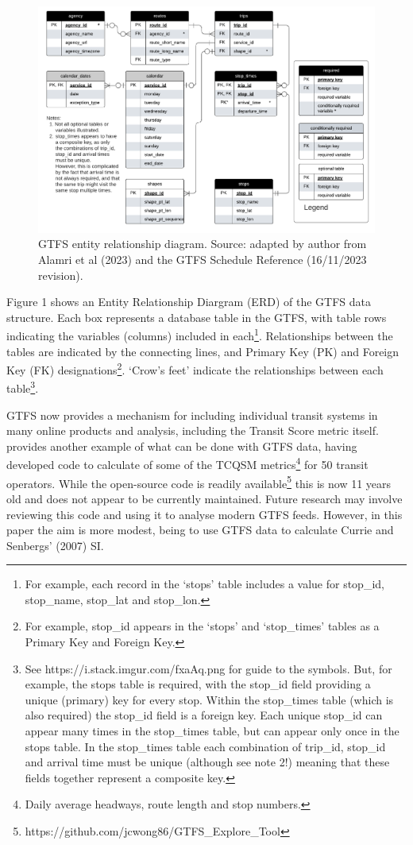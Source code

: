 \documentclass[preprint, 3p,
authoryear]{elsarticle} %
\begin{document}
\begin{figure}
\includegraphics[width=1\linewidth]{graphics/GTFS} \caption{GTFS entity relationship diagram. Source: adapted by author from Alamri et al (2023) and the GTFS Schedule Reference (16/11/2023 revision).}\label{fig:GTFS_ERD}
\end{figure}

Figure 1 shows an Entity Relationship Diargram (ERD) of the GTFS data
structure. Each box represents a database table in the GTFS, with table
rows indicating the variables (columns) included in each\footnote{ For
  example, each record in the `stops' table includes a value for
  stop\_id, stop\_name, stop\_lat and stop\_lon.}. Relationships between
the tables are indicated by the connecting lines, and Primary Key (PK)
and Foreign Key (FK) designations\footnote{ For example, stop\_id
  appears in the `stops' and `stop\_times' tables as a Primary Key and
  Foreign Key.}. `Crow's feet' indicate the relationships between each
table\footnote{ See https://i.stack.imgur.com/fxaAq.png for guide to the
  symbols. But, for example, the stops table is required, with the
  stop\_id field providing a unique (primary) key for every stop. Within
  the stop\_times table (which is also required) the stop\_id field is a
  foreign key. Each unique stop\_id can appear many times in the
  stop\_times table, but can appear only once in the stops table. In the
  stop\_times table each combination of trip\_id, stop\_id and arrival
  time must be unique (although see note 2!) meaning that these fields
  together represent a composite key.}.

GTFS now provides a mechanism for including individual transit systems
in many online products and analysis, including the Transit Score metric
itself. \citet{Wong:2013aa} provides another example of what can be done
with GTFS data, having developed code to calculate of some of the TCQSM
metrics\footnote{ Daily average headways, route length and stop numbers.}
for 50 transit operators. While the \citet{Wong:2013aa} open-source code
is readily available\footnote{
  https://github.com/jcwong86/GTFS\_Explore\_Tool} this is now 11 years
old and does not appear to be currently maintained. Future research may
involve reviewing this code and using it to analyse modern GTFS feeds.
However, in this paper the aim is more modest, being to use GTFS data to
calculate Currie and Senbergs' (2007) SI.
\end{document}
